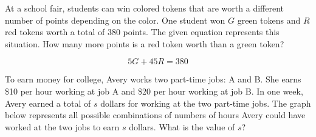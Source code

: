 \vspace{0.75em}


\newpage

\noindent\markforreview

\vspace{1em}

At a school fair, students can win colored tokens that are worth a different number of points depending on the color. One student won \( G \) green tokens and \( R \) red tokens worth a total of 380 points. The given equation represents this situation. How many more points is a red token worth than a green token?

\[
5G + 45R = 380
\]

\vspace{2em}
\noindent\markforreview

\vspace{1em}

To earn money for college, Avery works two part-time jobs: A and B. She earns \$10 per hour working at job A and \$20 per hour working at job B. In one week, Avery earned a total of \( s \) dollars for working at the two part-time jobs. The graph below represents all possible combinations of numbers of hours Avery could have worked at the two jobs to earn \( s \) dollars. What is the value of \( s \)?

\begin{center}
\end{center}





